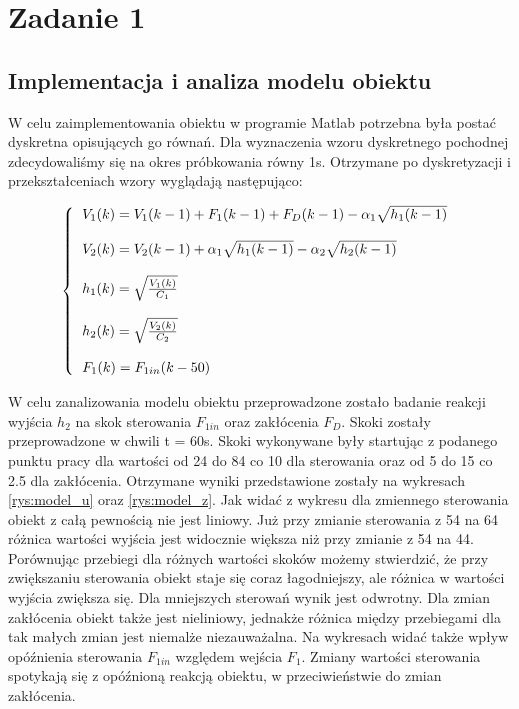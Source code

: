 \chapter{Zadanie 1}
	\label{ch:z1}
	\section{Implementacja i analiza modelu obiektu}
	\label{sec:model}
		W celu zaimplementowania obiektu w programie Matlab potrzebna była postać dyskretna opisujących go równań. Dla wyznaczenia wzoru dyskretnego pochodnej zdecydowaliśmy się na okres próbkowania równy 1s. Otrzymane po dyskretyzacji i przekształceniach wzory wyglądają następująco:
	
		\begin{equation}
			\left\{
			\begin{tabular}{l}
				$V_1(k) =V_1(k-1) + F_1(k-1) + F_D(k-1) - \alpha_1\sqrt{h_1(k-1)}$ \\\\
				$V_2(k) = V_2(k-1)+\alpha_1\sqrt{h_1(k-1)} - \alpha_2\sqrt{h_2(k-1)}$\\\\
				$h_1(k) = \sqrt{\frac{V_1(k)}{C_1}}$\\\\
				$h_2(k) = \sqrt{\frac{V_2(k)}{C_2}}$\\\\
				$F_1(k) = F_{1in}(k-50)$
			\end{tabular}
			\right.
			\label{eq:dyskretne}
		\end{equation}
	
		W celu zanalizowania modelu obiektu przeprowadzone zostało badanie reakcji wyjścia $h_2$ na skok sterowania $F_{1in}$ oraz zakłócenia $F_D$. Skoki zostały przeprowadzone w chwili t = 60s. Skoki wykonywane były startując z podanego punktu pracy dla wartości od 24 do 84 co 10 dla sterowania oraz od 5 do 15 co 2.5 dla zakłócenia. Otrzymane wyniki przedstawione zostały na wykresach \ref{rys:model_u} oraz \ref{rys:model_z}. Jak widać z wykresu dla zmiennego sterowania obiekt z całą pewnością nie jest liniowy. Już przy zmianie sterowania z 54 na 64 różnica wartości wyjścia jest widocznie większa niż przy zmianie z 54 na 44. Porównując przebiegi dla różnych wartości skoków możemy stwierdzić, że przy zwiększaniu sterowania obiekt staje się coraz łagodniejszy, ale różnica w wartości wyjścia zwiększa się. Dla mniejszych sterowań wynik jest odwrotny. Dla zmian zakłócenia obiekt także jest nieliniowy, jednakże różnica między przebiegami dla tak małych zmian jest niemalże niezauważalna. Na wykresach widać także wpływ opóźnienia sterowania $F_{1in}$ względem wejścia $F_1$. Zmiany wartości sterowania spotykają się z opóźnioną reakcją obiektu, w przeciwieństwie do zmian zakłócenia.
		
